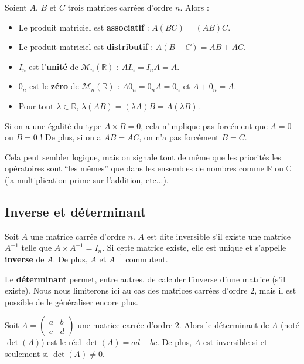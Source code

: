 	\begin{formula}
		Soient $A$, $B$ et $C$ trois matrices carrées d'ordre $n$. Alors :
		\begin{itemize}
			\item Le produit matriciel est \textbf{associatif} : $A(BC) = (AB)C$.
			\item Le produit matriciel est \textbf{distributif} : $A(B + C) = AB + AC$.
			\item $I_n$ est l'\textbf{unité} de $\mathcal{M}_{n}(\mathbb{R})$ : $AI_n = I_nA = A$.
			\item $0_n$ est le \textbf{zéro} de $\mathcal{M}_{n}(\mathbb{R})$ : $A0_n = 0_nA = 0_n$ et $A + 0_n = A$.
			\item Pour tout $\lambda \in \mathbb{R}$, $\lambda (AB) = (\lambda A)B = A(\lambda B)$.
		\end{itemize}
	\end{formula}

	\begin{tip}[Attention !]
		Si on a une égalité du type $A \times B = 0$, cela n'implique pas forcément que $A = 0$ ou $B = 0$ !
		\newpar
		De plus, si on a $AB = AC$, on n'a pas forcément $B = C$.
	\end{tip}

	Cela peut sembler logique, mais on signale tout de même que les priorités les opératoires sont ``les mêmes'' que dans les ensembles de nombres comme $\mathbb{R}$ ou $\mathbb{C}$ (la multiplication prime sur l'addition, etc...).

	\subsection{Inverse et déterminant}

	\begin{formula}
		Soit $A$ une matrice carrée d'ordre $n$. $A$ est dite inversible s'il existe une matrice $A^{-1}$ telle que $A \times A^{-1} = I_n$.
		\newpar
		Si cette matrice existe, elle est unique et s'appelle \textbf{inverse} de $A$. De plus, $A$ et $A^{-1}$ commutent.
	\end{formula}

	Le \textbf{déterminant} permet, entre autres, de calculer l'inverse d'une matrice (s'il existe). Nous nous limiterons ici au cas des matrices carrées d'ordre $2$, mais il est possible de le généraliser encore plus.

	\begin{formula}
		Soit $\displaystyle{A = \begin{pmatrix} a & b \\ c & d \end{pmatrix}}$ une matrice carrée d'ordre $2$.
		\newpar
		Alors le déterminant de $A$ (noté $\det(A)$) est le réel $\det(A) = ad - bc$. De plus, $A$ est inversible si et seulement si $\det(A) \neq 0$.
	\end{formula}

